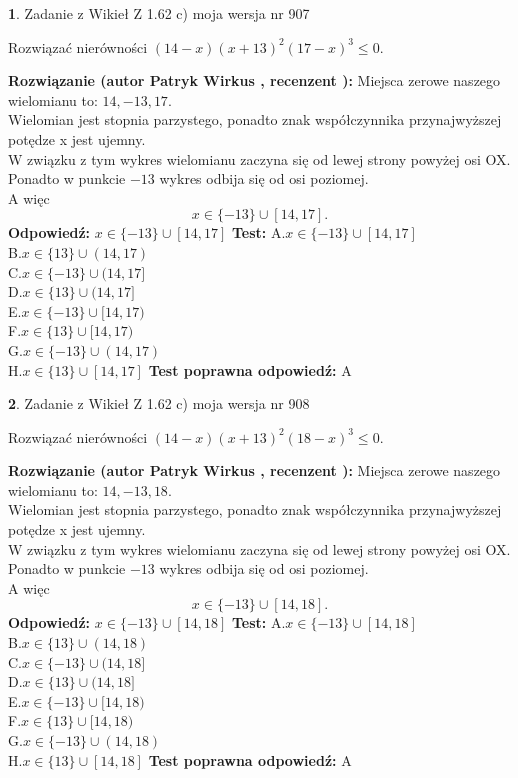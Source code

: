 \documentclass[12pt, a4paper]{article}
\theoremstyle{definition} %
\newtheorem{zad}{}
\newcommand{\zadStart}[1]{\begin{zad}#1\newline}
\newcommand{\zadStop}{\end{zad}}
\newcommand{\rozwStart}[2]{\noindent \textbf{Rozwiązanie (autor #1 , recenzent #2): }\newline}
\newcommand{\rozwStop}{\newline}
\newcommand{\odpStart}{\noindent \textbf{Odpowiedź:}\newline}
\newcommand{\odpStop}{\newline}
\newcommand{\testStart}{\noindent \textbf{Test:}\newline}
\newcommand{\testStop}{\newline}
\newcommand{\kluczStart}{\noindent \textbf{Test poprawna odpowiedź:}\newline}
\newcommand{\kluczStop}{\newline}
\begin{document}
\zadStart{Zadanie z Wikieł Z 1.62 c) moja wersja nr 907}

Rozwiązać nierówności $(14-x)(x+13)^{2}(17-x)^{3}\le0$.
\zadStop
\rozwStart{Patryk Wirkus}{}
Miejsca zerowe naszego wielomianu to: $14, -13, 17$.\\
Wielomian jest stopnia parzystego, ponadto znak współczynnika przy\linebreak najwyższej potędze x jest ujemny.\\ W związku z tym wykres wielomianu zaczyna się od lewej strony powyżej osi OX.\\
Ponadto w punkcie $-13$ wykres odbija się od osi poziomej.\\
A więc $$x \in \{-13\} \cup [14,17].$$
\rozwStop
\odpStart
$x \in \{-13\} \cup [14,17]$
\odpStop
\testStart
A.$x \in \{-13\} \cup [14,17]$\\
B.$x \in \{13\} \cup (14,17)$\\
C.$x \in \{-13\} \cup (14,17]$\\
D.$x \in \{13\} \cup (14,17]$\\
E.$x \in \{-13\} \cup [14,17)$\\
F.$x \in \{13\} \cup [14,17)$\\
G.$x \in \{-13\} \cup (14,17)$\\
H.$x \in \{13\} \cup [14,17]$
\testStop
\kluczStart
A
\kluczStop



\zadStart{Zadanie z Wikieł Z 1.62 c) moja wersja nr 908}

Rozwiązać nierówności $(14-x)(x+13)^{2}(18-x)^{3}\le0$.
\zadStop
\rozwStart{Patryk Wirkus}{}
Miejsca zerowe naszego wielomianu to: $14, -13, 18$.\\
Wielomian jest stopnia parzystego, ponadto znak współczynnika przy\linebreak najwyższej potędze x jest ujemny.\\ W związku z tym wykres wielomianu zaczyna się od lewej strony powyżej osi OX.\\
Ponadto w punkcie $-13$ wykres odbija się od osi poziomej.\\
A więc $$x \in \{-13\} \cup [14,18].$$
\rozwStop
\odpStart
$x \in \{-13\} \cup [14,18]$
\odpStop
\testStart
A.$x \in \{-13\} \cup [14,18]$\\
B.$x \in \{13\} \cup (14,18)$\\
C.$x \in \{-13\} \cup (14,18]$\\
D.$x \in \{13\} \cup (14,18]$\\
E.$x \in \{-13\} \cup [14,18)$\\
F.$x \in \{13\} \cup [14,18)$\\
G.$x \in \{-13\} \cup (14,18)$\\
H.$x \in \{13\} \cup [14,18]$
\testStop
\kluczStart
A
\kluczStop
\end{document}
